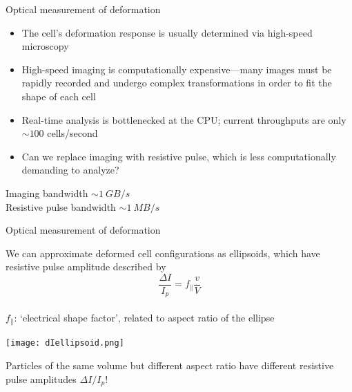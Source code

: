 \begin{frame}[c]{Optical measurement of deformation}
	\begin{itemize}
		\item The cell's deformation response is usually determined via high-speed microscopy \\
		\item High-speed imaging is computationally expensive---many images must be rapidly recorded and undergo complex transformations in order to fit the shape of each cell \\
		\item Real-time analysis is bottlenecked at the CPU; current throughputs are only $\sim100$ cells/second \\
		\item Can we replace imaging with resistive pulse, which is less computationally demanding to analyze?
	\end{itemize}
	
	Imaging bandwidth $\sim\SI{1}{GB/s}$ \\
	Resistive pulse bandwidth $\sim\SI{1}{MB/s}$
\end{frame}



\begin{frame}[c]{Optical measurement of deformation}

	{\scriptsize
		We can approximate deformed cell configurations as ellipsoids, which have resistive pulse amplitude described by \\
		
		\[ \frac{\Delta I}{I_{p}}=f_{\parallel}\frac{v}{V} \] \\
		
		$f_{\parallel}$: `electrical shape factor', related to aspect ratio of the ellipse \\
	}

	\vspace{.1in}
	
	{\centering
		\texttt{[image: dIellipsoid.png]} \\
		\par
	}
	
	\vspace{.1in}
	
	Particles of the same volume but different aspect ratio have different resistive pulse amplitudes $\Delta I/I_{p}$!
	
	
\end{frame}

